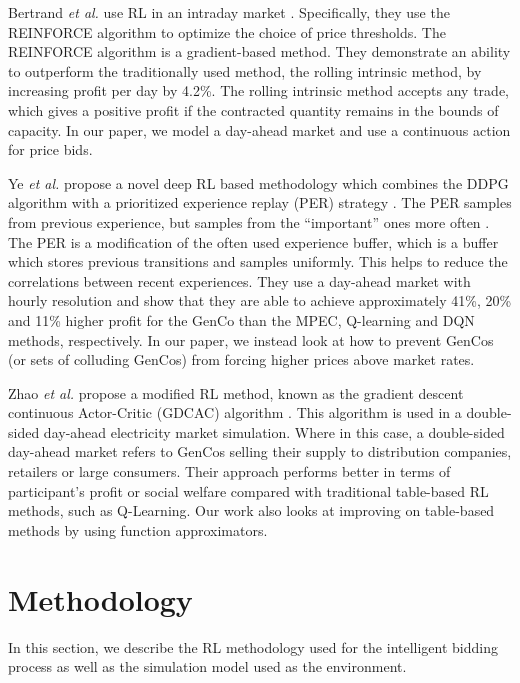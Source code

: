 \documentclass[conference]{IEEEtran}
\begin{document}
Bertrand \textit{et al.} use RL in an intraday market \cite{Bertrand2019}. Specifically, they use the REINFORCE algorithm to optimize the choice of price thresholds. The REINFORCE algorithm is a gradient-based method. They demonstrate an ability to outperform the traditionally used method, the rolling intrinsic method, by increasing profit per day by 4.2\%. The rolling intrinsic method accepts any trade, which gives a positive profit if the contracted quantity remains in the bounds of capacity. In our paper, we model a day-ahead market and use a continuous action for price bids.

Ye \textit{et al.} propose a novel deep RL based methodology which combines the DDPG algorithm with a prioritized experience replay (PER) strategy \cite{Ye2020a}. The PER samples from previous experience, but samples from the ``important'' ones more often \cite{Schaul2016}. The PER is a modification of the often used experience buffer, which is a buffer which stores previous transitions and samples uniformly. This helps to reduce the correlations between recent experiences. They use a day-ahead market with hourly resolution and show that they are able to achieve approximately 41\%, 20\% and 11\% higher profit for the GenCo than the MPEC, Q-learning and DQN methods, respectively. In our paper, we instead look at how to prevent GenCos (or sets of colluding GenCos) from forcing higher prices above market rates.



Zhao \textit{et al.} propose a modified RL method, known as the gradient descent continuous Actor-Critic (GDCAC) algorithm \cite{Zhao2016}. This algorithm is used in a double-sided day-ahead electricity market simulation. Where in this case, a double-sided day-ahead market refers to GenCos selling their supply to distribution companies, retailers or large consumers. Their approach performs better in terms of participant's profit or social welfare compared with traditional table-based RL methods, such as Q-Learning. Our work also looks at improving on table-based methods by using function approximators.





\section{Methodology}
\label{sec:material}

In this section, we describe the RL methodology used for the intelligent bidding process as well as the simulation model used as the environment.
\end{document}
